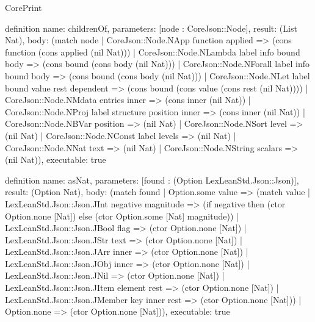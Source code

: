 \begin{lexlean}{CorePrint}
\begin{semanticmodule}
definition{
  name: childrenOf,
  parameters: [node : CoreJson::Node],
  result: (List Nat),
  body: (match node
    | CoreJson::Node.NApp function applied => (cons function (cons applied (nil Nat)))
    | CoreJson::Node.NLambda label info bound body => (cons bound (cons body (nil Nat)))
    | CoreJson::Node.NForall label info bound body => (cons bound (cons body (nil Nat)))
    | CoreJson::Node.NLet label bound value rest dependent => (cons bound (cons value (cons rest (nil Nat))))
    | CoreJson::Node.NMdata entries inner => (cons inner (nil Nat))
    | CoreJson::Node.NProj label structure position inner => (cons inner (nil Nat))
    | CoreJson::Node.NBVar position => (nil Nat)
    | CoreJson::Node.NSort level => (nil Nat)
    | CoreJson::Node.NConst label levels => (nil Nat)
    | CoreJson::Node.NNat text => (nil Nat)
    | CoreJson::Node.NString scalars => (nil Nat)),
  executable: true
}

definition{
  name: asNat,
  parameters: [found : (Option LexLeanStd.Json::Json)],
  result: (Option Nat),
  body: (match found
    | Option.some value => (match value
      | LexLeanStd.Json::Json.JInt negative magnitude => (if negative then (ctor Option.none [Nat]) else (ctor Option.some [Nat] magnitude))
      | LexLeanStd.Json::Json.JBool flag => (ctor Option.none [Nat])
      | LexLeanStd.Json::Json.JStr text => (ctor Option.none [Nat])
      | LexLeanStd.Json::Json.JArr inner => (ctor Option.none [Nat])
      | LexLeanStd.Json::Json.JObj inner => (ctor Option.none [Nat])
      | LexLeanStd.Json::Json.JNil => (ctor Option.none [Nat])
      | LexLeanStd.Json::Json.JItem element rest => (ctor Option.none [Nat])
      | LexLeanStd.Json::Json.JMember key inner rest => (ctor Option.none [Nat]))
    | Option.none => (ctor Option.none [Nat])),
  executable: true
}


\end{semanticmodule}
\end{lexlean}
